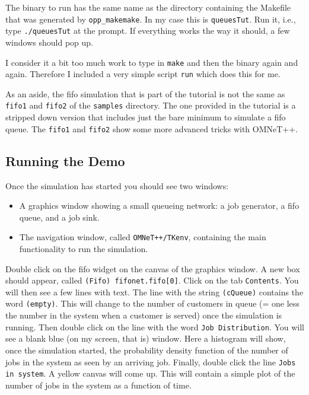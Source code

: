 \documentclass[a4paper]{article}
\begin{document}
The binary to run has the same name as the directory containing the
Makefile that was generated by \texttt{opp\_makemake}. In my case this
is \texttt{queuesTut}. Run it, i.e., type \texttt{./queuesTut} at the
prompt. If everything works the way it should, a few windows should
pop up.

I consider it a bit too much work to type in \texttt{make} and then
the binary  again and again. Therefore I included a very
simple script \texttt{run} which does this for me.

As an aside, the fifo simulation that is part of the tutorial is not
the same as  \texttt{fifo1} and \texttt{fifo2} of the \texttt{samples}
directory. The one provided in the tutorial is a stripped down version
that includes just the bare minimum to simulate a fifo queue. The
\texttt{fifo1} and \texttt{fifo2} show some more advanced tricks with OMNeT++.

\subsection{Running the Demo}
\label{sec:running-simulation}
Once the simulation has started you should see two windows:
\begin{itemize}
\item A graphics window showing a small queueing network: a job
  generator, a fifo queue, and a job sink.
\item The navigation window, called \texttt{OMNeT++/TKenv}, containing
  the main functionality to run the simulation.
\end{itemize}

Double click on the fifo widget on the canvas of the graphics window.
A new box should appear, called \texttt{(Fifo) fifonet.fifo[0]}. Click
on the tab \texttt{Contents}.  You will then see a few lines with text.
The line with the string \texttt{(cQueue)} contains the word
\texttt{(empty)}.  This will change to the number of customers in
queue (= one less the number in the system when a customer is served)
once the simulation is running.  Then double click on the line with
the word \texttt{Job Distribution}.  You will see a blank blue (on my
screen, that is) window. Here a histogram will show, once the
simulation started, the probability density function of the number of
jobs in the system as seen by an arriving job. Finally, double click
the line \texttt{Jobs in system}. A yellow canvas will come up. This
will contain a simple plot of the number of jobs in the system as a
function of time.
\end{document}
